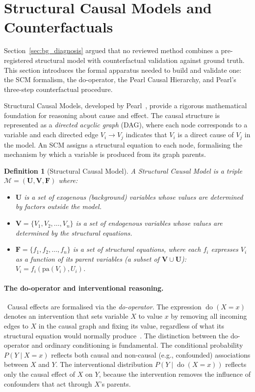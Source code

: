 \documentclass[11pt,a4paper]{report}
\newtheorem{definition}{Definition}[chapter]
\newcommand{\doop}{\operatorname{do}}
\newcommand{\SCM}{\mathcal{M}}
\begin{document}
\section{Structural Causal Models and Counterfactuals}
\label{sec:bg_scm}

Section~\ref{sec:bg_diagnosis} argued that no reviewed method combines a pre-registered structural model with counterfactual validation against ground truth. This section introduces the formal apparatus needed to build and validate one: the SCM formalism, the do-operator, the Pearl Causal Hierarchy, and Pearl's three-step counterfactual procedure.

Structural Causal Models, developed by Pearl~\cite{pearl2009causality}, provide a rigorous mathematical foundation for reasoning about cause and effect. The causal structure is represented as a \emph{directed acyclic graph} (DAG), where each node corresponds to a variable and each directed edge $V_i \to V_j$ indicates that $V_i$ is a direct cause of $V_j$ in the model. An SCM assigns a structural equation to each node, formalising the mechanism by which a variable is produced from its graph parents.

\begin{definition}[Structural Causal Model]
A Structural Causal Model is a triple $\SCM = (\mathbf{U}, \mathbf{V}, \mathbf{F})$ where:
\begin{itemize}
  \item $\mathbf{U}$ is a set of \emph{exogenous} (background) variables whose values are determined by factors outside the model.
  \item $\mathbf{V} = \{V_1, V_2, \ldots, V_n\}$ is a set of \emph{endogenous} variables whose values are determined by the structural equations.
  \item $\mathbf{F} = \{f_1, f_2, \ldots, f_n\}$ is a set of \emph{structural equations}, where each $f_i$ expresses $V_i$ as a function of its parent variables (a subset of $\mathbf{V} \cup \mathbf{U}$): $V_i = f_i(\text{pa}(V_i), U_i)$.
\end{itemize}
\end{definition}

\paragraph{The do-operator and interventional reasoning.}~Causal effects are formalised via the \emph{do-operator}. The expression $\doop(X = x)$ denotes an intervention that sets variable $X$ to value $x$ by removing all incoming edges to $X$ in the causal graph and fixing its value, regardless of what its structural equation would normally produce~\cite{pearl2009causality}. The distinction between the do-operator and ordinary conditioning is fundamental. The conditional probability $P(Y \mid X = x)$ reflects both causal and non-causal (e.g., confounded) associations between $X$ and $Y$. The interventional distribution $P(Y \mid \doop(X = x))$ reflects only the causal effect of $X$ on $Y$, because the intervention removes the influence of confounders that act through $X$'s parents.
\end{document}
